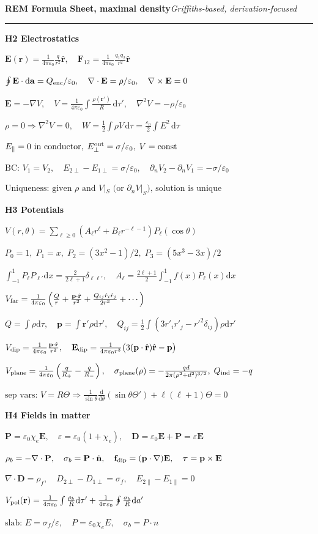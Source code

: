 \documentclass[a4paper]{article}
\newcommand{\E}{\mathbf{E}}
\newcommand{\D}{\mathbf{D}}
\newcommand{\p}{\mathbf{p}}
\newcommand{\n}{\hat{\mathbf{n}}}
\newcommand{\dd}{\mathrm{d}}
\newcommand{\ep}{\varepsilon}
\newcommand{\secblock}[1]{\vspace{0.08ex}\textbf{#1}\par}
\newcommand{\eqline}[1]{\(#1\)\par}
\begin{document}
\fontsize{4.7}{4.95}\selectfont
\textbf{REM Formula Sheet, maximal density}\hfill\textit{Griffiths-based, derivation-focused}\par
\vspace{0.08ex}\hrule\vspace{0.08ex}

\begin{multicols*}{6}

\secblock{H2 Electrostatics}
\eqline{\E(\mathbf r)=\frac{1}{4\pi\ep_0}\frac{q}{r^2}\hat{\mathbf r},\quad \mathbf F_{12}=\frac{1}{4\pi\ep_0}\frac{q_1q_2}{r^2}\hat{\mathbf r}}
\eqline{\oint\E\cdot\dd\mathbf a=Q_{\rm enc}/\ep_0,\quad \nabla\cdot\E=\rho/\ep_0,\quad \nabla\times\E=0}
\eqline{\E=-\nabla V,\quad V=\frac{1}{4\pi\ep_0}\int\frac{\rho(\mathbf r')}{R}\,\dd\tau',\quad \nabla^2V=-\rho/\ep_0}
\eqline{\rho=0\Rightarrow\nabla^2V=0,\quad W=\tfrac12\int\rho V\,\dd\tau=\tfrac{\ep_0}{2}\int E^2\,\dd\tau}
\eqline{E_{\parallel}=0\text{ in conductor},\;E_{\perp}^{\rm out}=\sigma/\ep_0,\;V={\rm const}}
\eqline{\text{BC: }V_1=V_2,\quad E_{2\perp}-E_{1\perp}=\sigma/\ep_0,\quad \partial_nV_2-\partial_nV_1=-\sigma/\ep_0}
\eqline{\text{Uniqueness: given }\rho\text{ and }V|_S\text{ (or }\partial_nV|_S\text{), solution is unique}}

\secblock{H3 Potentials}
\eqline{V(r,\theta)=\sum_{\ell\ge0}(A_\ell r^\ell+B_\ell r^{-\ell-1})P_\ell(\cos\theta)}
\eqline{P_0=1,\;P_1=x,\;P_2=(3x^2-1)/2,\;P_3=(5x^3-3x)/2}
\eqline{\int_{-1}^{1}P_\ell P_{\ell'}\dd x=\frac{2}{2\ell+1}\delta_{\ell\ell'},\quad A_\ell=\frac{2\ell+1}{2}\int_{-1}^{1}f(x)P_\ell(x)\dd x}
\eqline{V_{\rm far}=\frac{1}{4\pi\ep_0}\left(\frac{Q}{r}+\frac{\p\cdot\hat{\mathbf r}}{r^2}+\frac{Q_{ij}\hat r_i\hat r_j}{2r^3}+\cdots\right)}
\eqline{Q=\int\rho\dd\tau,\quad \p=\int\mathbf r'\rho\dd\tau',\quad Q_{ij}=\frac12\int(3r'_ir'_j-r'^2\delta_{ij})\rho\dd\tau'}
\eqline{V_{\rm dip}=\frac{1}{4\pi\ep_0}\frac{\p\cdot\hat{\mathbf r}}{r^2},\quad \E_{\rm dip}=\frac{1}{4\pi\ep_0r^3}\big(3(\p\cdot\hat{\mathbf r})\hat{\mathbf r}-\p\big)}
\eqline{V_{\rm plane}=\frac{1}{4\pi\ep_0}\left(\frac{q}{R_+}-\frac{q}{R_-}\right),\quad \sigma_{\rm plane}(\rho)=-\frac{qd}{2\pi(\rho^2+d^2)^{3/2}},\;Q_{\rm ind}=-q}
\eqline{\text{sep vars: }V=R\Theta\Rightarrow\frac{1}{\sin\theta}\frac{\dd}{\dd\theta}(\sin\theta\Theta')+\ell(\ell+1)\Theta=0}

\secblock{H4 Fields in matter}
\eqline{\mathbf P=\ep_0\chi_e\E,\quad \ep=\ep_0(1+\chi_e),\quad \D=\ep_0\E+\mathbf P=\ep\E}
\eqline{\rho_b=-\nabla\cdot\mathbf P,\quad \sigma_b=\mathbf P\cdot\n,\quad \mathbf f_{\rm dip}=(\p\cdot\nabla)\E,\quad \boldsymbol\tau=\p\times\E}
\eqline{\nabla\cdot\D=\rho_f,\quad D_{2\perp}-D_{1\perp}=\sigma_f,\quad E_{2\parallel}-E_{1\parallel}=0}
\eqline{V_{\rm pol}(\mathbf r)=\frac{1}{4\pi\ep_0}\int\frac{\rho_b}{R}\dd\tau'+\frac{1}{4\pi\ep_0}\oint\frac{\sigma_b}{R}\dd a'}
\eqline{\text{slab: }E=\sigma_f/\ep,\quad P=\ep_0\chi_eE,\quad \sigma_b=P\cdot n}


\end{multicols*}
\end{document}
